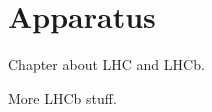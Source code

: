 \chapter{Apparatus}
\thispagestyle{plainbottom}
Chapter about LHC and LHCb.

\clearpage
More LHCb stuff.
